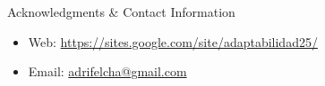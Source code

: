 \documentclass[final]{beamer}
\newlength{\sepwid}
\newlength{\onecolwid}
\newlength{\twocolwid}
\begin{document}
\begin{frame}[t]
\begin{columns}[t]
\begin{column}{\twocolwid}
\begin{columns}[t,totalwidth=\twocolwid]
\begin{column}{\onecolwid}
\begin{alertblock}{Acknowledgments \& Contact Information}
\small{} \\

\begin{itemize}
\item Web: \href{https://sites.google.com/site/adaptabilidad25/}{https://sites.google.com/site/adaptabilidad25/}
\item Email: \href{mailto:adrifelcha@gmail.com}{adrifelcha@gmail.com}
\end{itemize}


\end{alertblock}


\end{column} %

\end{columns} %


\begin{columns}[t,totalwidth=\twocolwid] %

\begin{column}{\onecolwid} %


\end{column} %

\end{columns} %

\end{column} %

\begin{column}{\sepwid}\end{column} %

\setlength{\onecolwid}{0.252\paperwidth} %
\begin{column}{\onecolwid} %



\end{column}
\end{columns}
\end{frame}
\end{document}
